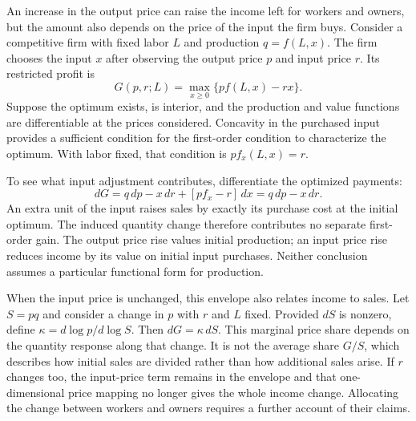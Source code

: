 An increase in the output price can raise the income left for workers and owners,
but the amount also depends on the price of the input the firm buys. Consider a
competitive firm with fixed labor $L$ and production $q=f(L,x)$. The firm chooses
the input $x$ after observing the output price $p$ and input price $r$. Its
restricted profit is
\[
 G(p,r;L)=\max_{x\geq0}\{p f(L,x)-rx\}.
\]
Suppose the optimum exists, is interior, and the production and value functions
are differentiable at the prices considered. Concavity in the purchased input
provides a sufficient condition for the first-order condition to characterize
the optimum. With labor fixed, that condition is $p f_x(L,x)=r$.

To see what input adjustment contributes, differentiate the optimized payments:
\[
 dG=q\,dp-x\,dr+[p f_x-r]\,dx=q\,dp-x\,dr.
\]
An extra unit of the input raises sales by exactly its purchase cost at the
initial optimum. The induced quantity change therefore contributes no separate
first-order gain. The output price rise values initial production; an input
price rise reduces income by its value on initial input purchases. Neither
conclusion assumes a particular functional form for production.

When the input price is unchanged, this envelope also relates income to sales.
Let $S=pq$ and consider a change in $p$ with $r$ and $L$ fixed. Provided $dS$ is
nonzero, define $\kappa=d\log p/d\log S$. Then $dG=\kappa\,dS$. This marginal
price share depends on the quantity response along that change. It is not the
average share $G/S$, which describes how initial sales are divided rather than
how additional sales arise. If $r$ changes too, the input-price term remains in
the envelope and that one-dimensional price mapping no longer gives the whole
income change. Allocating the change between workers and owners requires a
further account of their claims.

